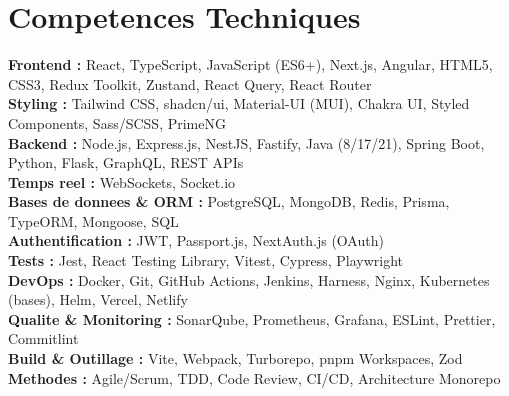 \documentclass[10pt,a4paper]{article}
\begin{document}
\section*{Competences Techniques}
{\small
\textbf{Frontend :} React, TypeScript, JavaScript (ES6+), Next.js, Angular, HTML5, CSS3, Redux Toolkit, Zustand, React Query, React Router\\[2pt]
\textbf{Styling :} Tailwind CSS, shadcn/ui, Material-UI (MUI), Chakra UI, Styled Components, Sass/SCSS, PrimeNG\\[2pt]
\textbf{Backend :} Node.js, Express.js, NestJS, Fastify, Java (8/17/21), Spring Boot, Python, Flask, GraphQL, REST APIs\\[2pt]
\textbf{Temps reel :} WebSockets, Socket.io\\[2pt]
\textbf{Bases de donnees \& ORM :} PostgreSQL, MongoDB, Redis, Prisma, TypeORM, Mongoose, SQL\\[2pt]
\textbf{Authentification :} JWT, Passport.js, NextAuth.js (OAuth)\\[2pt]
\textbf{Tests :} Jest, React Testing Library, Vitest, Cypress, Playwright\\[2pt]
\textbf{DevOps :} Docker, Git, GitHub Actions, Jenkins, Harness, Nginx, Kubernetes (bases), Helm, Vercel, Netlify\\[2pt]
\textbf{Qualite \& Monitoring :} SonarQube, Prometheus, Grafana, ESLint, Prettier, Commitlint\\[2pt]
\textbf{Build \& Outillage :} Vite, Webpack, Turborepo, pnpm Workspaces, Zod\\[2pt]
\textbf{Methodes :} Agile/Scrum, TDD, Code Review, CI/CD, Architecture Monorepo
}

\end{document}
